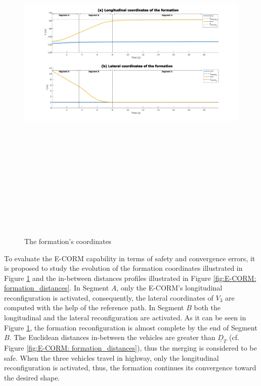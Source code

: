         \begin{figure}[!h]
        \centering 
        \includegraphics[width=14cm,height=18cm,keepaspectratio]{chapters/Chapitre_5/Figures/E-CORM/Formation_coordinates.pdf}
        \caption{The formation's coordinates}
        \label{fig:E-CORM: formation_coordinates}
        \end{figure}


To evaluate the E-CORM capability in terms of safety and convergence errors, it is proposed to study the evolution of the formation coordinates illustrated in Figure \ref{fig:E-CORM: formation_coordinates} and the in-between distances profiles illustrated in Figure \ref{fig:E-CORM: formation_distances}. In Segment $A$, only the E-CORM's longitudinal reconfiguration is activated, consequently, the lateral coordinates of $V_3$ are computed with the help of the reference path. In Segment $B$ both the longitudinal and the lateral reconfiguration are activated. As it can be seen in Figure \ref{fig:E-CORM: formation_coordinates}, the formation reconfiguration is almost complete by the end of Segment $B$. The Euclidean distances in-between the vehicles are greater than $\underline{D}_T$ (cf. Figure \ref{fig:E-CORM: formation_distances}), thus the merging is considered to be safe. When the three vehicles travel in highway, only the longitudinal reconfiguration is activated, thus, the formation continues its convergence toward the desired shape. 

